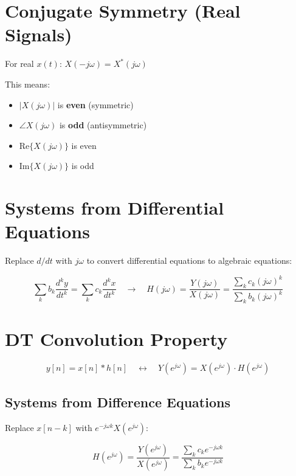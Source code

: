 \documentclass[11pt]{article}
\begin{document}
\section*{Conjugate Symmetry (Real Signals)}

For real $x(t)$: $X(-j\omega) = X^*(j\omega)$

This means:
\begin{itemize}
  \item $|X(j\omega)|$ is \textbf{even} (symmetric)
  \item $\angle X(j\omega)$ is \textbf{odd} (antisymmetric)
  \item $\text{Re}\{X(j\omega)\}$ is even
  \item $\text{Im}\{X(j\omega)\}$ is odd
\end{itemize}

\section*{Systems from Differential Equations}

Replace $d/dt$ with $j\omega$ to convert differential equations to algebraic equations:

\[\sum_k b_k \frac{d^k y}{dt^k} = \sum_k c_k \frac{d^k x}{dt^k} \quad \longrightarrow \quad H(j\omega) = \frac{Y(j\omega)}{X(j\omega)} = \frac{\sum_k c_k (j\omega)^k}{\sum_k b_k (j\omega)^k}\]

\section*{DT Convolution Property}

\[y[n] = x[n] * h[n] \quad \longleftrightarrow \quad Y(e^{j\omega}) = X(e^{j\omega}) \cdot H(e^{j\omega})\]

\subsection*{Systems from Difference Equations}

Replace $x[n-k]$ with $e^{-j\omega k} X(e^{j\omega})$:

\[H(e^{j\omega}) = \frac{Y(e^{j\omega})}{X(e^{j\omega})} = \frac{\sum_k c_k e^{-j\omega k}}{\sum_k b_k e^{-j\omega k}}\]
\end{document}
